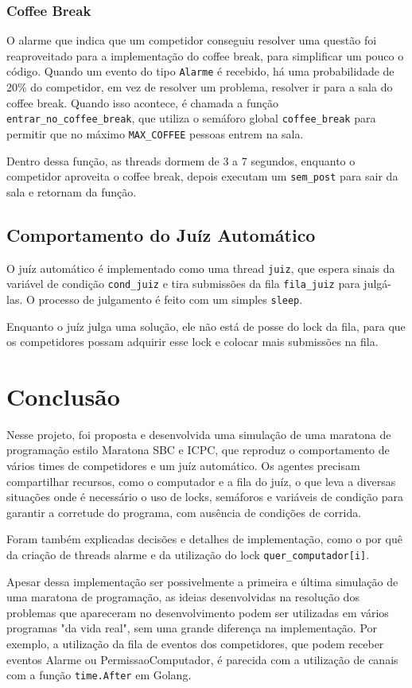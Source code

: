 \documentclass[11pt]{article}
\newcommand{\code}{\lstinline[mathescape=true]}
\begin{document}
	\subsubsection{Coffee Break}
	O alarme que indica que um competidor conseguiu resolver uma questão foi reaproveitado para a
	implementação do coffee break, para simplificar um pouco o código. Quando um evento do tipo
	\code{Alarme} é recebido, há uma probabilidade de 20\% do competidor, em vez de resolver um problema,
	resolver ir para a sala do coffee break. Quando isso acontece, é chamada a função
	\code{entrar_no_coffee_break}, que utiliza o semáforo global \code{coffee_break} para permitir que no
	máximo \code{MAX_COFFEE} pessoas entrem na sala.

	Dentro dessa função, as threads dormem de 3 a 7 segundos, enquanto o competidor aproveita o coffee
	break, depois executam um \code{sem_post} para sair da sala e retornam da função.


	\subsection{Comportamento do Juíz Automático}
	O juíz automático é implementado como uma thread \code{juiz}, que espera sinais da variável de
	condição \code{cond_juiz} e tira submissões da fila \code{fila_juiz} para julgá-las. O processo de
	julgamento é feito com um simples \code{sleep}.

	Enquanto o juíz julga uma solução, ele não está de posse do lock da fila, para que os competidores
	possam adquirir esse lock e colocar mais submissões na fila.


	\section{Conclusão}
	Nesse projeto, foi proposta e desenvolvida uma simulação de uma maratona de programação estilo
	Maratona SBC e ICPC, que reproduz o comportamento de vários times de competidores e um juíz
	automático. Os agentes precisam compartilhar recursos, como o computador e a fila do juíz, o que leva
	a diversas situações onde é necessário o uso de locks, semáforos e variáveis de condição para
	garantir a corretude do programa, com ausência de condições de corrida.

	Foram também explicadas decisões e detalhes de implementação, como o por quê da criação de threads
	alarme e da utilização do lock \code{quer_computador[i]}.

	Apesar dessa implementação ser possivelmente a primeira e última simulação de uma maratona de
	programação, as ideias desenvolvidas na resolução dos problemas que apareceram no desenvolvimento
	podem ser utilizadas em vários programas "da vida real", sem uma grande diferença na implementação.
	Por exemplo, a utilização da fila de eventos dos competidores, que podem receber eventos Alarme ou
	PermissaoComputador, é parecida com a utilização de canais com a função \code{time.After} em
	Golang\cite{golang}.



	\medskip
	\printbibliography


	
\end{document}
